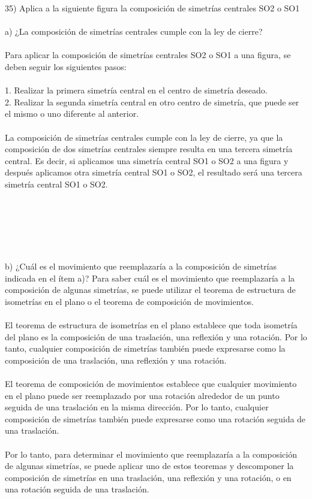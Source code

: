 \documentclass{article}
\begin{document}
35) Aplica a la siguiente figura la composición de simetrías centrales SO2 o SO1  \\ \\
a)  ¿La composición de simetrías centrales cumple con la ley de cierre? \\ \\
Para aplicar la composición de simetrías centrales SO2 o SO1 a una figura, se deben seguir los siguientes pasos:\\
\\
1. Realizar la primera simetría central en el centro de simetría deseado.\\
2. Realizar la segunda simetría central en otro centro de simetría, que puede ser el mismo o uno diferente al anterior.\\
\\
La composición de simetrías centrales cumple con la ley de cierre, ya que la composición de dos simetrías centrales siempre resulta en una tercera simetría central. Es decir, si aplicamos una simetría central SO1 o SO2 a una figura y después aplicamos otra simetría central SO1 o SO2, el resultado será una tercera simetría central SO1 o SO2.\\
\\
\\
\\
\\
\\
\\
b) ¿Cuál es el movimiento que reemplazaría a la composición de simetrías indicada en el ítem a)?
Para saber cuál es el movimiento que reemplazaría a la composición de algunas simetrías, se puede utilizar el teorema de estructura de isometrías en el plano o el teorema de composición de movimientos.\\
\\
El teorema de estructura de isometrías en el plano establece que toda isometría del plano es la composición de una traslación, una reflexión y una rotación. Por lo tanto, cualquier composición de simetrías también puede expresarse como la composición de una traslación, una reflexión y una rotación.\\
\\
El teorema de composición de movimientos establece que cualquier movimiento en el plano puede ser reemplazado por una rotación alrededor de un punto seguida de una traslación en la misma dirección. Por lo tanto, cualquier composición de simetrías también puede expresarse como una rotación seguida de una traslación.\\
\\
Por lo tanto, para determinar el movimiento que reemplazaría a la composición de algunas simetrías, se puede aplicar uno de estos teoremas y descomponer la composición de simetrías en una traslación, una reflexión y una rotación, o en una rotación seguida de una traslación.\\
\end{document}
